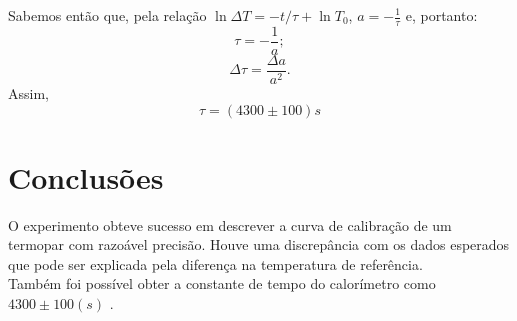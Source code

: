 \documentclass[12pt,a4paper]{article}
\begin{document}
Sabemos então que, pela relação $ \ln \Delta T = -t/\tau + \ln T_0 $, $a = -\frac{1}{\tau}$ e, portanto:
$$ \tau = -\frac{1}{a}; $$
$$ \Delta\tau =\frac{\Delta a}{a^2}. $$
Assim, 
$$ \tau = (4300 \pm 100)s $$
%

\section{Conclusões}
O experimento obteve sucesso em descrever a curva de calibração de um termopar com razoável precisão. Houve uma discrepância com os dados esperados que pode ser explicada pela diferença na temperatura de referência.\\
Também foi possível obter a constante de tempo do calorímetro como $4300 \pm 100 (s)$ .
\end{document}
